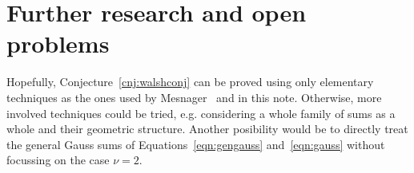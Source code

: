 \documentclass[11pt,a4paper]{article}
\makeatletter
\newcommand{\eg}{e.g.\@\xspace}
\makeatother
\begin{document}
\section{Further research and open problems}

Hopefully, Conjecture~\ref{cnj:walshconj} can be proved using only elementary
techniques as the ones used by Mesnager~\cite{DBLP:journals/dcc/Mesnager11}
and in this note.
Otherwise, more involved techniques could be tried, \eg considering a whole
family of sums as a whole and their geometric structure.
Another posibility would be to directly treat the general Gauss sums of
Equations~\ref{eqn:gengauss} and~\ref{eqn:gauss} without focussing
on the case $\nu = 2$.



\end{document}

